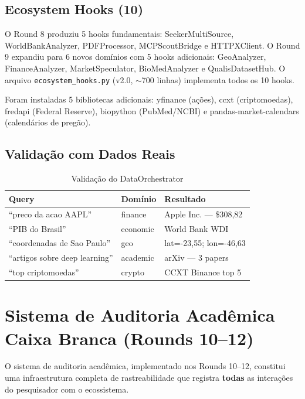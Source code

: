 \documentclass[12pt,a4paper]{article}
\begin{document}
\subsection{Ecosystem Hooks (10)}

O Round 8 produziu 5 hooks fundamentais: SeekerMultiSource, WorldBankAnalyzer, PDFProcessor, MCPScoutBridge e HTTPXClient. O Round 9 expandiu para 6 novos domínios com 5 hooks adicionais: GeoAnalyzer, FinanceAnalyzer, MarketSpeculator, BioMedAnalyzer e QualisDatasetHub. O arquivo \texttt{ecosystem\_hooks.py} (v2.0, $\sim$700 linhas) implementa todos os 10 hooks.

Foram instaladas 5 bibliotecas adicionais: yfinance (ações), ccxt (criptomoedas), fredapi (Federal Reserve), biopython (PubMed/NCBI) e pandas-market-calendars (calendários de pregão).

\subsection{Validação com Dados Reais}

\begin{table}[H]
  \centering
  \caption{Validação do DataOrchestrator}
  \label{tab:validation}
  \begin{tabular}{l l l}
    \toprule
    \textbf{Query} & \textbf{Domínio} & \textbf{Resultado} \\
    \midrule
    ``preco da acao AAPL''       & finance   & Apple Inc. --- \$308,82 \\
    ``PIB do Brasil''            & economic  & World Bank WDI \\
    ``coordenadas de Sao Paulo'' & geo       & lat=-23,55; lon=-46,63 \\
    ``artigos sobre deep learning'' & academic & arXiv --- 3 papers \\
    ``top criptomoedas''         & crypto    & CCXT Binance top 5 \\
    \bottomrule
  \end{tabular}
\end{table}

\section{Sistema de Auditoria Acadêmica Caixa Branca (Rounds 10--12)}

O sistema de auditoria acadêmica, implementado nos Rounds 10--12, constitui uma infraestrutura completa de rastreabilidade que registra \textbf{todas} as interações do pesquisador com o ecossistema.
\end{document}
